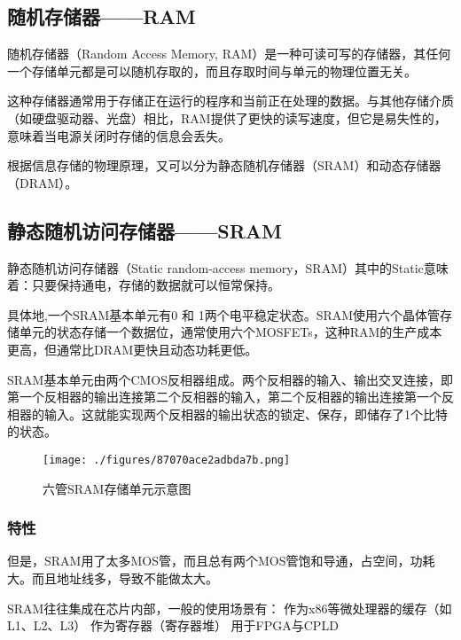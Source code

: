 
\begin{issues}
\issueDraft
\end{issues}

\subsection{随机存储器——RAM}

随机存储器（Random Access Memory, RAM）是一种可读可写的存储器，其任何一个存储单元都是可以随机存取的，而且存取时间与单元的物理位置无关。

这种存储器通常用于存储正在运行的程序和当前正在处理的数据。与其他存储介质（如硬盘驱动器、光盘）相比，RAM提供了更快的读写速度，但它是易失性的，意味着当电源关闭时存储的信息会丢失。

根据信息存储的物理原理，又可以分为静态随机存储器（SRAM）和动态存储器（DRAM）。


\subsection{静态随机访问存储器——SRAM}

静态随机访问存储器（Static random-access memory，SRAM）其中的Static意味着：只要保持通电，存储的数据就可以恒常保持。

具体地,一个SRAM基本单元有0 和 1两个电平稳定状态。SRAM使用六个晶体管存储单元的状态存储一个数据位，通常使用六个MOSFETs，这种RAM的生产成本更高，但通常比DRAM更快且动态功耗更低。

SRAM基本单元由两个CMOS反相器组成。两个反相器的输入、输出交叉连接，即第一个反相器的输出连接第二个反相器的输入，第二个反相器的输出连接第一个反相器的输入。这就能实现两个反相器的输出状态的锁定、保存，即储存了1个比特的状态。

\begin{figure}[ht]
\centering
\texttt{[image: ./figures/87070ace2adbda7b.png]}
\caption{六管SRAM存储单元示意图} \label{fig_RAM_3}
\end{figure}

\subsubsection{特性}


但是，SRAM用了太多MOS管，而且总有两个MOS管饱和导通，占空间，功耗大。而且地址线多，导致不能做太大。

SRAM往往集成在芯片内部，一般的使用场景有：
作为x86等微处理器的缓存（如L1、L2、L3）
作为寄存器（寄存器堆）
用于FPGA与CPLD

